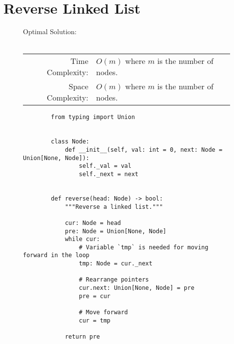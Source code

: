 
\section{Reverse Linked List}

\begin{figure}[H]
    Optimal Solution:\\\\
    \begin{tabular}{rl}
        Time Complexity:& \(O(m)\) where \(m\) is the number of nodes.\\
        Space Complexity:& \(O(m)\) where \(m\) is the number of nodes.
    \end{tabular}
\end{figure}

\begin{figure}[H]
    \centering
    \begin{verbatim}
        from typing import Union


        class Node:
            def __init__(self, val: int = 0, next: Node = Union[None, Node]):
                self._val = val
                self._next = next


        def reverse(head: Node) -> bool:
            """Reverse a linked list."""

            cur: Node = head
            pre: Node = Union[None, Node]
            while cur:
                # Variable `tmp` is needed for moving forward in the loop
                tmp: Node = cur._next

                # Rearrange pointers
                cur.next: Union[None, Node] = pre
                pre = cur

                # Move forward
                cur = tmp

            return pre
    \end{verbatim}
\end{figure}
